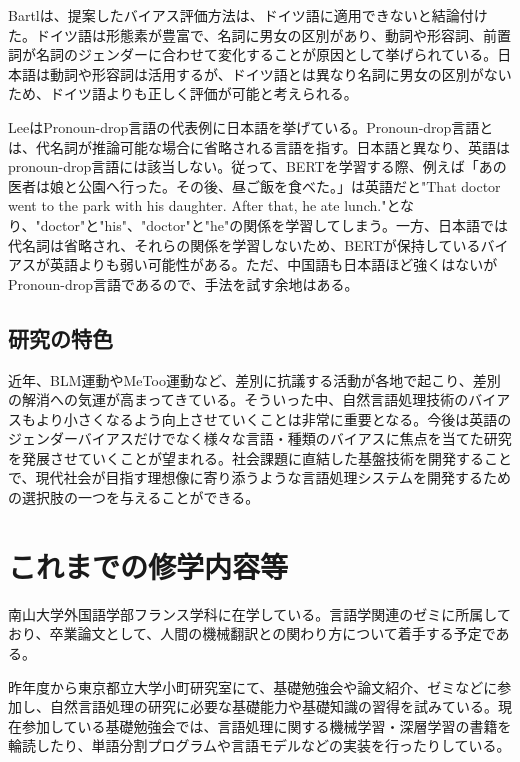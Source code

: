 \documentclass[a4j,10pt, twocolumn]{jarticle} \usepackage[dvipdfmx]{graphicx} \usepackage{amssymb} \usepackage{amsmath}
\begin{document}
Bartlは、提案したバイアス評価方法は、ドイツ語に適用できないと結論付けた\cite{Bartl}。ドイツ語は形態素が豊富で、名詞に男女の区別があり、動詞や形容詞、前置詞が名詞のジェンダーに合わせて変化することが原因として挙げられている。日本語は動詞や形容詞は活用するが、ドイツ語とは異なり名詞に男女の区別がないため、ドイツ語よりも正しく評価が可能と考えられる。

LeeはPronoun-drop言語の代表例に日本語を挙げている\cite{Lee}。Pronoun-drop言語とは、代名詞が推論可能な場合に省略される言語を指す。日本語と異なり、英語はpronoun-drop言語には該当しない。従って、BERTを学習する際、例えば「あの医者は娘と公園へ行った。その後、昼ご飯を食べた。」は英語だと"That doctor went to the park with his daughter. After that, he ate lunch."となり、"doctor"と"his"、"doctor"と"he"の関係を学習してしまう。一方、日本語では代名詞は省略され、それらの関係を学習しないため、BERTが保持しているバイアスが英語よりも弱い可能性がある。ただ、中国語も日本語ほど強くはないがPronoun-drop言語であるので、手法を試す余地はある。

\subsection{研究の特色}
近年、BLM運動やMeToo運動など、差別に抗議する活動が各地で起こり、差別の解消への気運が高まってきている。そういった中、自然言語処理技術のバイアスもより小さくなるよう向上させていくことは非常に重要となる。今後は英語のジェンダーバイアスだけでなく様々な言語・種類のバイアスに焦点を当てた研究を発展させていくことが望まれる。社会課題に直結した基盤技術を開発することで、現代社会が目指す理想像に寄り添うような言語処理システムを開発するための選択肢の一つを与えることができる。

\section{これまでの修学内容等}
南山大学外国語学部フランス学科に在学している。言語学関連のゼミに所属しており、卒業論文として、人間の機械翻訳との関わり方について着手する予定である。

昨年度から東京都立大学小町研究室にて、基礎勉強会や論文紹介、ゼミなどに参加し、自然言語処理の研究に必要な基礎能力や基礎知識の習得を試みている。現在参加している基礎勉強会では、言語処理に関する機械学習・深層学習の書籍を輪読したり、単語分割プログラムや言語モデルなどの実装を行ったりしている。
\end{document}
